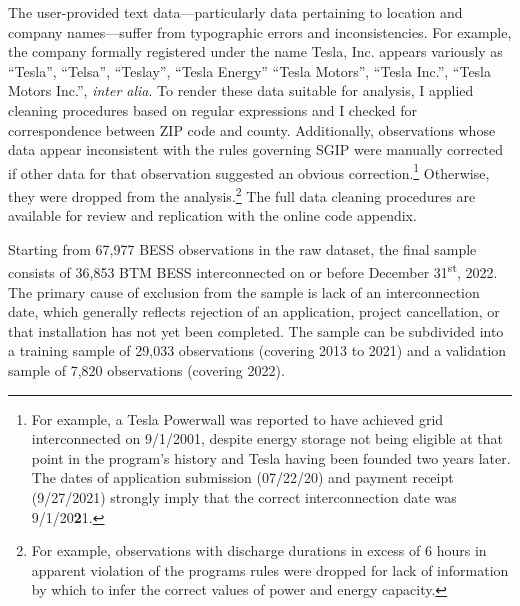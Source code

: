 \documentclass[preprint,12pt,authoryear]{elsarticle}
\newcommand\Xst{\textsuperscript{st}}
\begin{document}
The user-provided text data---particularly data pertaining to location and company names---suffer from typographic errors and inconsistencies. For example, the company formally registered under the name Tesla, Inc. appears variously as ``Tesla'', ``Telsa'', ``Teslay'', ``Tesla Energy'' ``Tesla Motors'', ``Tesla Inc.'', ``Tesla Motors Inc.'', \textit{inter alia}. To render these data suitable for analysis, I applied cleaning procedures based on regular expressions and I checked for correspondence between ZIP code and county. Additionally, observations whose data appear inconsistent with the rules governing SGIP were manually corrected if other data for that observation suggested an obvious correction.\footnote{For example, a Tesla Powerwall was reported to have achieved grid interconnected on 9/1/2001, despite energy storage not being eligible at that point in the program's history and Tesla having been founded two years later. The dates of application submission (07/22/20) and payment receipt (9/27/2021) strongly imply that the correct interconnection date was 9/1/20\textbf{2}1.} Otherwise, they were dropped from the analysis.\footnote{For example, observations with discharge durations in excess of 6 hours in apparent violation of the programs rules were dropped for lack of information by which to infer the correct values of power and energy capacity.} The full data cleaning procedures are available for review and replication with the online code appendix.

Starting from 67,977 BESS observations in the raw dataset, the final sample consists of 36,853 BTM BESS interconnected on or before December 31\Xst, 2022. The primary cause of exclusion from the sample is lack of an interconnection date, which generally reflects rejection of an application, project cancellation, or that installation has not yet been completed. The sample can be subdivided into a training sample of 29,033 observations (covering 2013 to 2021) and a validation sample of 7,820 observations (covering 2022).
\end{document}
